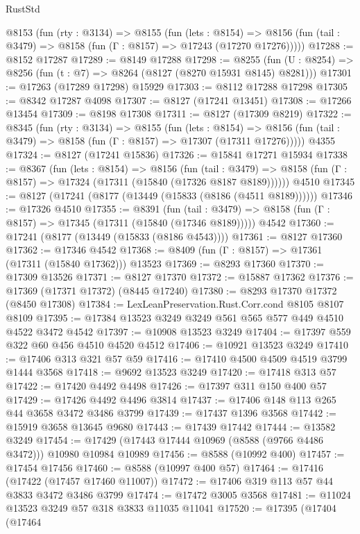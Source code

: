 \begin{lexlean}{RustStd}
\begin{coremodule}
  @8153
    (fun (rty : @3134) =>
    @8155
      (fun (lets : @8154) =>
      @8156 (fun (tail : @3479) => @8158 (fun (Γ : @8157) => @17243 (@17270 @17276)))))
@17288 := @8152 @17287
@17289 := @8149 @17288
@17298 := @8255
    (fun (U : @8254) => @8256 (fun (t : @7) => @8264 (@8127 (@8270 @15931 @8145) @8281)))
@17301 := @17263 (@17289 @17298) @15929
@17303 := @8112 @17288 @17298
@17305 := @8342 @17287 @4098
@17307 := @8127 (@17241 @13451)
@17308 := @17266 @13454
@17309 := @8198 @17308
@17311 := @8127 (@17309 @8219)
@17322 := @8345
    (fun (rty : @3134) =>
    @8155
      (fun (lets : @8154) =>
      @8156 (fun (tail : @3479) => @8158 (fun (Γ : @8157) => @17307 (@17311 @17276)))))
    @4355
@17324 := @8127 (@17241 @15836)
@17326 := @15841 @17271 @15934
@17338 := @8367
    (fun (lets : @8154) =>
    @8156
      (fun (tail : @3479) =>
      @8158 (fun (Γ : @8157) => @17324 (@17311 (@15840 (@17326 @8187 @8189))))))
    @4510
@17345 := @8127 (@17241 (@8177 (@13449 (@15833 (@8186 (@4511 @8189))))))
@17346 := @17326 @4510
@17355 := @8391
    (fun (tail : @3479) => @8158 (fun (Γ : @8157) => @17345 (@17311 (@15840 (@17346 @8189)))))
    @4542
@17360 := @17241 (@8177 (@13449 (@15833 (@8186 @4543))))
@17361 := @8127 @17360
@17362 := @17346 @4542
@17368 := @8409 (fun (Γ : @8157) => @17361 (@17311 (@15840 @17362))) @13523
@17369 := @8293 @17360
@17370 := @17309 @13526
@17371 := @8127 @17370
@17372 := @15887 @17362
@17376 := @17369 (@17371 @17372) (@8445 @17240)
@17380 := @8293 @17370 @17372 (@8450 @17308)
@17384 := LexLeanPreservation.Rust.Corr.cond @8105 @8107 @8109
@17395 := @17384 @13523 @3249 @3249 @561 @565 @577 @449 @4510 @4522 @3472 @4542
@17397 := @10908 @13523 @3249
@17404 := @17397 @559 @322 @60 @456 @4510 @4520 @4512
@17406 := @10921 @13523 @3249
@17410 := @17406 @313 @321 @57 @59
@17416 := @17410 @4500 @4509 @4519 @3799 @1444 @3568
@17418 := @9692 @13523 @3249
@17420 := @17418 @313 @57
@17422 := @17420 @4492 @4498
@17426 := @17397 @311 @150 @400 @57
@17429 := @17426 @4492 @4496 @3814
@17437 := @17406 @148 @113 @265 @44 @3658 @3472 @3486 @3799
@17439 := @17437 @1396 @3568
@17442 := @15919 @3658 @13645 @9680
@17443 := @17439 @17442
@17444 := @13582 @3249
@17454 := @17429 (@17443 @17444 @10969 (@8588 (@9766 @4486 @3472))) @10980 @10984 @10989
@17456 := @8588 (@10992 @400)
@17457 := @17454 @17456
@17460 := @8588 (@10997 @400 @57)
@17464 := @17416 (@17422 (@17457 @17460 @11007))
@17472 := @17406 @319 @113 @57 @44 @3833 @3472 @3486 @3799
@17474 := @17472 @3005 @3568
@17481 := @11024 @13523 @3249 @57 @318 @3833 @11035 @11041
@17520 := @17395
    (@17404
      (@17464

\end{coremodule}
\end{lexlean}

